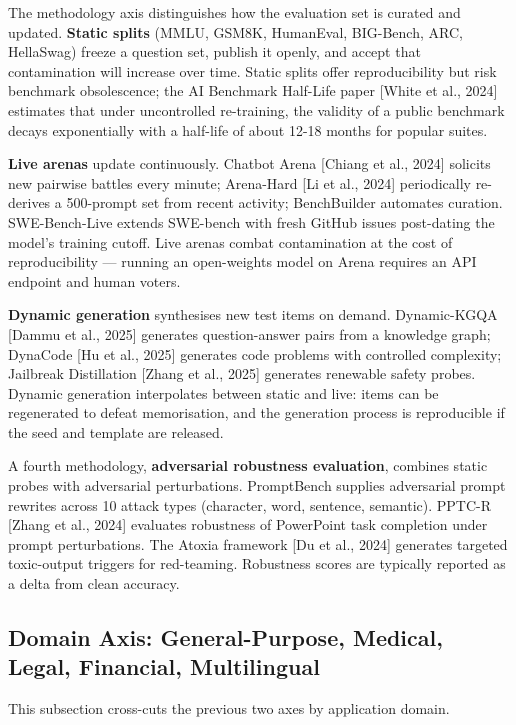 The methodology axis distinguishes how the evaluation set is curated and updated. \textbf{Static splits} (MMLU, GSM8K, HumanEval, BIG-Bench, ARC, HellaSwag) freeze a question set, publish it openly, and accept that contamination will increase over time. Static splits offer reproducibility but risk benchmark obsolescence; the AI Benchmark Half-Life paper {[}White et al., 2024{]} estimates that under uncontrolled re-training, the validity of a public benchmark decays exponentially with a half-life of about 12-18 months for popular suites.

\textbf{Live arenas} update continuously. Chatbot Arena {[}Chiang et al., 2024{]} solicits new pairwise battles every minute; Arena-Hard {[}Li et al., 2024{]} periodically re-derives a 500-prompt set from recent activity; BenchBuilder automates curation. SWE-Bench-Live extends SWE-bench with fresh GitHub issues post-dating the model's training cutoff. Live arenas combat contamination at the cost of reproducibility --- running an open-weights model on Arena requires an API endpoint and human voters.

\textbf{Dynamic generation} synthesises new test items on demand. Dynamic-KGQA {[}Dammu et al., 2025{]} generates question-answer pairs from a knowledge graph; DynaCode {[}Hu et al., 2025{]} generates code problems with controlled complexity; Jailbreak Distillation {[}Zhang et al., 2025{]} generates renewable safety probes. Dynamic generation interpolates between static and live: items can be regenerated to defeat memorisation, and the generation process is reproducible if the seed and template are released.

A fourth methodology, \textbf{adversarial robustness evaluation}, combines static probes with adversarial perturbations. PromptBench supplies adversarial prompt rewrites across 10 attack types (character, word, sentence, semantic). PPTC-R {[}Zhang et al., 2024{]} evaluates robustness of PowerPoint task completion under prompt perturbations. The Atoxia framework {[}Du et al., 2024{]} generates targeted toxic-output triggers for red-teaming. Robustness scores are typically reported as a delta from clean accuracy.

\subsection{Domain Axis: General-Purpose, Medical, Legal, Financial, Multilingual}\label{domain-axis-general-purpose-medical-legal-financial-multilingual}

This subsection cross-cuts the previous two axes by application domain.

